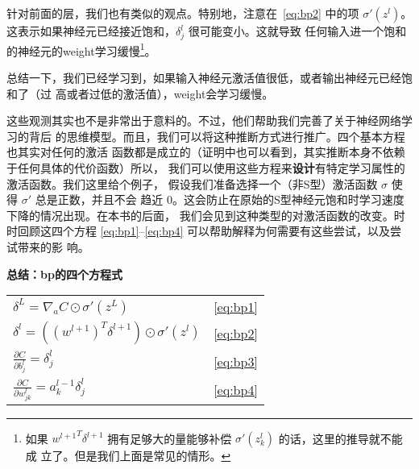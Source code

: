 针对前面的层，我们也有类似的观点。特别地，注意在~\eqref{eq:bp2} 中的项
$\sigma'(z^l)$。这表示如果神经元已经接近饱和，$\delta_j^l$ 很可能变小。这就导致
任何输入进一个饱和的神经元的\gls*{weight}学习缓慢\footnote{如果 ${w^{l+1}}^T
  \delta^{l+1}$ 拥有足够大的量能够补偿 $\sigma'(z_k^l)$ 的话，这里的推导就不能成
  立了。但是我们上面是常见的情形。}。

总结一下，我们已经学习到，如果输入神经元激活值很低，或者输出神经元已经饱和了（过
  高或者过低的激活值），\gls*{weight}会学习缓慢。

这些观测其实也不是非常出于意料的。不过，他们帮助我们完善了关于神经网络学习的背后
的思维模型。而且，我们可以将这种推断方式进行推广。四个基本方程也其实对任何的激活
函数都是成立的（证明中也可以看到，其实推断本身不依赖于任何具体的代价函数）所以，
我们可以使用这些方程来\textbf{设计}有特定学习属性的激活函数。我们这里给个例子，
假设我们准备选择一个（非S型）激活函数 $\sigma$ 使得 $\sigma'$ 总是正数，并且不会
趋近 $0$。这会防止在原始的S型神经元饱和时学习速度下降的情况出现。在本书的后面，
我们会见到这种类型的对激活函数的改变。时时回顾这四个方程
\eqref{eq:bp1}--\eqref{eq:bp4} 可以帮助解释为何需要有这些尝试，以及尝试带来的影
响。

\begin{center}
  \begin{minipage}{0.7\textwidth}
    \begin{framed}
      \centering
      \textbf{总结：\gls*{bp}的四个方程式}\label{backpropsummary}\\
      \vspace{1.5ex}
      \begin{tabular}{ll}
        $\delta^L = \nabla_a C \odot \sigma'(z^L)$            & \hspace{2cm}\eqref{eq:bp1} \\[1.5ex]
        $\delta^l = ((w^{l+1})^T \delta^{l+1}) \odot \sigma'(z^l)$ & \hspace{2cm}\eqref{eq:bp2} \\[1.5ex]
        $\frac{\partial C}{\partial b^l_j} = \delta^l_j$       & \hspace{2cm}\eqref{eq:bp3} \\[1.5ex]
        $\frac{\partial C}{\partial w^l_{jk}} = a^{l-1}_k \delta^l_j$ & \hspace{2cm}\eqref{eq:bp4}
      \end{tabular}
    \end{framed}
  \end{minipage}
\end{center}

